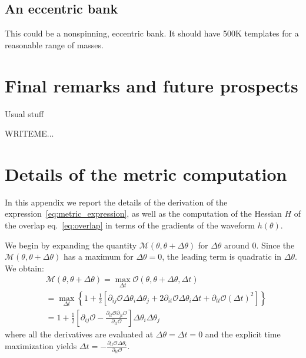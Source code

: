 \documentclass[twocolumn,showpacs,preprintnumbers,nofootinbib,prd,
superscriptaddress,10pt]{revtex4-1}
\begin{document}
\subsection{An eccentric bank}
This could be a nonspinning, eccentric bank. It should have 500K templates for a reasonable range of masses.

\section{Final remarks and future prospects} \label{sec:conclusion}
Usual stuff

        \begin{acknowledgments}
         
          WRITEME...
        \end{acknowledgments}

\appendix
\section{Details of the metric computation}\label{app:metric}

In this appendix we report the details of the derivation of the expression~\eqref{eq:metric_expression}, as well as the computation of the Hessian $H$ of the overlap eq.~\eqref{eq:overlap} in terms of the gradients of the waveform $h(\theta)$. 

We begin by expanding the quantity $\mathcal{M}(\theta,\theta +\Delta\theta)$ for $\Delta\theta$ around $0$. Since the $\mathcal{M}(\theta,\theta +\Delta\theta)$ has a maximum for $\Delta\theta = 0$, the leading term is quadratic in $\Delta\theta$.
We obtain:
\begin{align} \label{eq:metric_derivation}
	&\mathcal{M}(\theta,\theta +\Delta\theta) = \max_{\Delta t} \mathcal{O}(\theta, \theta + \Delta\theta, \Delta t) \nonumber\\
	& =	\max_{\Delta t} \left\{ 1+ \frac{1}{2}\left[ \partial_{ij}\mathcal{O} \Delta\theta_i \Delta\theta_j + 2  \partial_{it}\mathcal{O} \Delta\theta_i \Delta t + \partial_{tt}\mathcal{O} (\Delta t)^2 \right] \right\}  \nonumber \\
	&= 1 + \frac{1}{2}\left[ \partial_{ij}\mathcal{O} - \frac{\partial_{it}\mathcal{O} \partial_{jt}\mathcal{O}}{\partial_{tt}\mathcal{O}}\right] \Delta\theta_i \Delta\theta_j
\end{align}
where all the derivatives are evaluated at ${\Delta\theta = \Delta t = 0}$ and the explicit time maximization yields
${\Delta t = -\frac{\partial_{it}\mathcal{O} \Delta\theta_i}{\partial_{tt}\mathcal{O}}}$.
\end{document}
